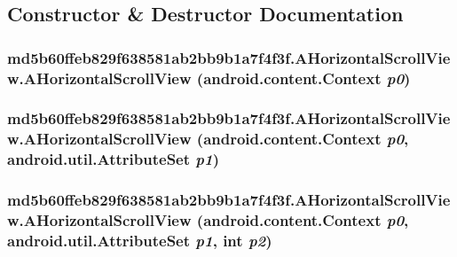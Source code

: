 \subsection{Constructor \& Destructor Documentation}
\hypertarget{classmd5b60ffeb829f638581ab2bb9b1a7f4f3f_1_1_a_horizontal_scroll_view_f5243d774c5a226c8d990803ca71be44}{
\subsubsection[{AHorizontalScrollView}]{\setlength{\rightskip}{0pt plus 5cm}md5b60ffeb829f638581ab2bb9b1a7f4f3f.AHorizontalScrollView.AHorizontalScrollView (android.content.Context {\em p0})}}
\label{classmd5b60ffeb829f638581ab2bb9b1a7f4f3f_1_1_a_horizontal_scroll_view_f5243d774c5a226c8d990803ca71be44}


\hypertarget{classmd5b60ffeb829f638581ab2bb9b1a7f4f3f_1_1_a_horizontal_scroll_view_152d1e31c4cbb0b713c94c701d37a586}{
\subsubsection[{AHorizontalScrollView}]{\setlength{\rightskip}{0pt plus 5cm}md5b60ffeb829f638581ab2bb9b1a7f4f3f.AHorizontalScrollView.AHorizontalScrollView (android.content.Context {\em p0}, \/  android.util.AttributeSet {\em p1})}}
\label{classmd5b60ffeb829f638581ab2bb9b1a7f4f3f_1_1_a_horizontal_scroll_view_152d1e31c4cbb0b713c94c701d37a586}


\hypertarget{classmd5b60ffeb829f638581ab2bb9b1a7f4f3f_1_1_a_horizontal_scroll_view_39296f4d2bb34f96db535ce39d024d99}{
\subsubsection[{AHorizontalScrollView}]{\setlength{\rightskip}{0pt plus 5cm}md5b60ffeb829f638581ab2bb9b1a7f4f3f.AHorizontalScrollView.AHorizontalScrollView (android.content.Context {\em p0}, \/  android.util.AttributeSet {\em p1}, \/  int {\em p2})}}
\label{classmd5b60ffeb829f638581ab2bb9b1a7f4f3f_1_1_a_horizontal_scroll_view_39296f4d2bb34f96db535ce39d024d99}


